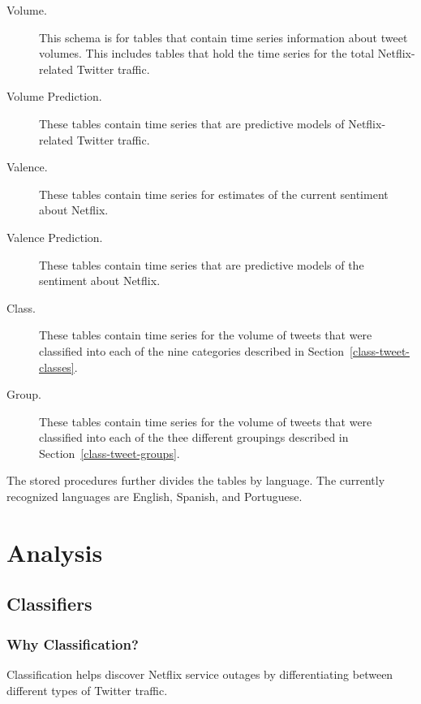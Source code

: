 \documentclass[12pt]{ucthesis}
\begin{document}
\begin{description}
   \item[Volume.]
   This schema is for tables that contain time series information about tweet volumes.
   This includes tables that hold the time series for the total Netflix-related Twitter traffic.

   \item[Volume Prediction.]
   These tables contain time series that are predictive models of Netflix-related Twitter traffic.

   \item[Valence.]
   These tables contain time series for estimates of the current sentiment about Netflix.

   \item[Valence Prediction.]
   These tables contain time series that are predictive models of the sentiment about Netflix.

   \item[Class.]
   These tables contain time series for the volume of tweets that were classified into
   each of the nine categories described in Section~\ref{class-tweet-classes}.

   \item[Group.]
   These tables contain time series for the volume of tweets that were classified into
   each of the thee different groupings described in Section~\ref{class-tweet-groups}.
\end{description}

The stored procedures further divides the tables by language. The currently recognized languages are English,
Spanish, and Portuguese.

\part{Analysis}
\label{analysis}

\chapter{Classifiers}
\label{classifiers}

\section{Why Classification?}
\label{class-why}
Classification helps discover Netflix service outages by differentiating between different types of Twitter traffic.
\end{document}
